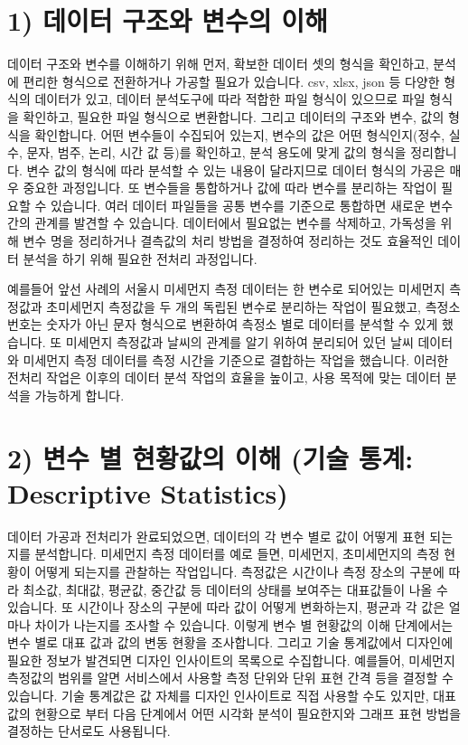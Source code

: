 \documentclass[
  letterpaper,
]{book}
\begin{document}
\section{1) 데이터 구조와 변수의
이해}\label{uxb370uxc774uxd130-uxad6cuxc870uxc640-uxbcc0uxc218uxc758-uxc774uxd574}

데이터 구조와 변수를 이해하기 위해 먼저, 확보한 데이터 셋의 형식을
확인하고, 분석에 편리한 형식으로 전환하거나 가공할 필요가 있습니다. csv,
xlsx, json 등 다양한 형식의 데이터가 있고, 데이터 분석도구에 따라 적합한
파일 형식이 있으므로 파일 형식을 확인하고, 필요한 파일 형식으로
변환합니다. 그리고 데이터의 구조와 변수, 값의 형식을 확인합니다. 어떤
변수들이 수집되어 있는지, 변수의 값은 어떤 형식인지(정수, 실수, 문자,
범주, 논리, 시간 값 등)를 확인하고, 분석 용도에 맞게 값의 형식을
정리합니다. 변수 값의 형식에 따라 분석할 수 있는 내용이 달라지므로
데이터 형식의 가공은 매우 중요한 과정입니다. 또 변수들을 통합하거나 값에
따라 변수를 분리하는 작업이 필요할 수 있습니다. 여러 데이터 파일들을
공통 변수를 기준으로 통합하면 새로운 변수 간의 관계를 발견할 수
있습니다. 데이터에서 필요없는 변수를 삭제하고, 가독성을 위해 변수 명을
정리하거나 결측값의 처리 방법을 결정하여 정리하는 것도 효율적인 데이터
분석을 하기 위해 필요한 전처리 과정입니다.

예를들어 앞선 사례의 서울시 미세먼지 측정 데이터는 한 변수로 되어있는
미세먼지 측정값과 초미세먼지 측정값을 두 개의 독립된 변수로 분리하는
작업이 필요했고, 측정소 번호는 숫자가 아닌 문자 형식으로 변환하여 측정소
별로 데이터를 분석할 수 있게 했습니다. 또 미세먼지 측정값과 날씨의
관계를 알기 위하여 분리되어 있던 날씨 데이터와 미세먼지 측정 데이터를
측정 시간을 기준으로 결합하는 작업을 했습니다. 이러한 전처리 작업은
이후의 데이터 분석 작업의 효율을 높이고, 사용 목적에 맞는 데이터 분석을
가능하게 합니다.

\section{2) 변수 별 현황값의 이해 (기술 통계: Descriptive
Statistics)}\label{uxbcc0uxc218-uxbcc4-uxd604uxd669uxac12uxc758-uxc774uxd574-uxae30uxc220-uxd1b5uxacc4-descriptive-statistics}

데이터 가공과 전처리가 완료되었으면, 데이터의 각 변수 별로 값이 어떻게
표현 되는지를 분석합니다. 미세먼지 측정 데이터를 예로 들면, 미세먼지,
초미세먼지의 측정 현황이 어떻게 되는지를 관찰하는 작업입니다. 측정값은
시간이나 측정 장소의 구분에 따라 최소값, 최대값, 평균값, 중간값 등
데이터의 상태를 보여주는 대표값들이 나올 수 있습니다. 또 시간이나 장소의
구분에 따라 값이 어떻게 변화하는지, 평균과 각 값은 얼마나 차이가
나는지를 조사할 수 있습니다. 이렇게 변수 별 현황값의 이해 단계에서는
변수 별로 대표 값과 값의 변동 현황을 조사합니다. 그리고 기술 통계값에서
디자인에 필요한 정보가 발견되면 디자인 인사이트의 목록으로 수집합니다.
예를들어, 미세먼지 측정값의 범위를 알면 서비스에서 사용할 측정 단위와
단위 표현 간격 등을 결정할 수 있습니다. 기술 통계값은 값 자체를 디자인
인사이트로 직접 사용할 수도 있지만, 대표값의 현황으로 부터 다음 단계에서
어떤 시각화 분석이 필요한지와 그래프 표현 방법을 결정하는 단서로도
사용됩니다.
\end{document}
